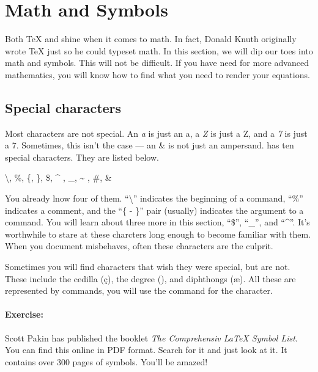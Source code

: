     \section{Math and Symbols}
    \label{Math}

	Both \TeX{} and \LaTeXe{} shine when it comes to math. In fact, Donald Knuth originally wrote \TeX{} just so he could typeset math. In this section, we will dip our toes into math and symbols. This will not be difficult. If you have need for more advanced mathematics, you will know how to find what you need to render your equations.

        \subsection{Special characters}
        \label{Special-characters}
        
		Most characters are not special. An \textit{a} is just an a, a \textit{Z} is just a Z, and a \textit{7} is just a 7. Sometimes, this isn't the case --- an \&  is not just an ampersand. \LaTeXe{} has ten special characters. They are listed below.

        \begin{framed}
			\textbackslash, \%, \{, \}, \$, \^{} , \_, \~{} , \#, \&
        \end{framed}

		You already lnow four of them. ``\textbackslash'' indicates the beginning of a command, ``\%'' indicates a comment, and the ``\{ - \}'' pair (usually) indicates the argument to a command. You will learn about three more in this section, ``\$'', ``\_'', and ``\^{}''. It's worthwhile to stare at these charcters long enough to become familiar with them. When you document misbehaves, often these characters are the culprit.

		Sometimes you will find characters that wish they were special, but are not. These include the cedilla (\c{c}), the degree (\textdegree), and diphthongs (\ae). All these are represented by \LaTeXe{} commands, you will use the command for the character.

		\paragraph{Exercise:}Scott Pakin has published the booklet \textit{The Comprehensiv \LaTeX{} Symbol List}. You can find this online in PDF format. Search for it and just look at it. It contains over 300 pages of symbols. You'll be amazed! 

